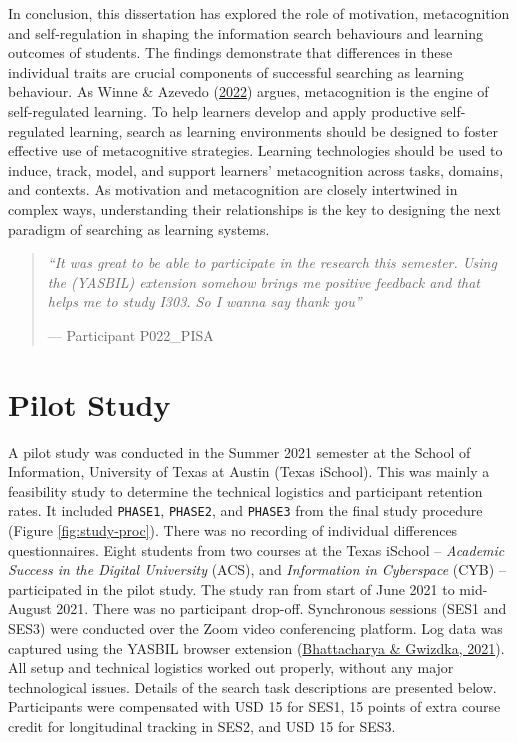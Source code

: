 \documentclass[letterpaper, nobind]{templates/ociamthesis}
\begin{document}
In conclusion, this dissertation has explored the role of motivation, metacognition and self-regulation in shaping the information search behaviours and learning outcomes of students.
The findings demonstrate that differences in these individual traits are crucial components of successful searching as learning behaviour.
As Winne \& Azevedo (\protect\hyperlink{ref-winne2022metacognition}{2022}) argues, metacognition is the engine of self-regulated learning.
To help learners develop and apply productive self-regulated learning, search as learning environments should be designed to foster effective use of metacognitive strategies.
Learning technologies should be used to induce, track, model, and support learners' metacognition across tasks, domains, and contexts.
As motivation and metacognition are closely intertwined in complex ways, understanding their relationships is the key to designing the next paradigm of searching as learning systems.

\begin{quote}
\emph{``It was great to be able to participate in the research this semester. Using the (YASBIL) extension somehow brings me positive feedback and that helps me to study I303. So I wanna say thank you''}

\hfill --- Participant P022\_PISA
\end{quote}

\startappendices

\hypertarget{app-pilot-study}{%
\chapter{Pilot Study}\label{app-pilot-study}}

A pilot study was conducted in the Summer 2021 semester at the School of
Information, University of Texas at Austin (Texas iSchool). This was
mainly a feasibility study to determine the technical logistics and
participant retention rates. It included \texttt{PHASE1}, \texttt{PHASE2}, and \texttt{PHASE3} from the final study procedure (Figure \ref{fig:study-proc}). There was no recording of individual
differences questionnaires. Eight students from two courses
at the Texas iSchool -- \emph{Academic Success in the Digital University}
(ACS), and \emph{Information in Cyberspace} (CYB) -- participated in the
pilot study. The study ran from start of June 2021 to mid-August 2021.
There was no participant drop-off. Synchronous sessions (SES1 and SES3)
were conducted over the Zoom video conferencing platform. Log data was
captured using the YASBIL browser extension (\protect\hyperlink{ref-bhattacharya2021yasbil}{Bhattacharya \& Gwizdka, 2021}).
All setup and technical logistics worked out properly, without any major
technological issues. Details of the search task descriptions are
presented below. Participants were compensated with USD 15 for SES1, 15
points of extra course credit for longitudinal tracking in SES2, and USD
15 for SES3.
\end{document}

